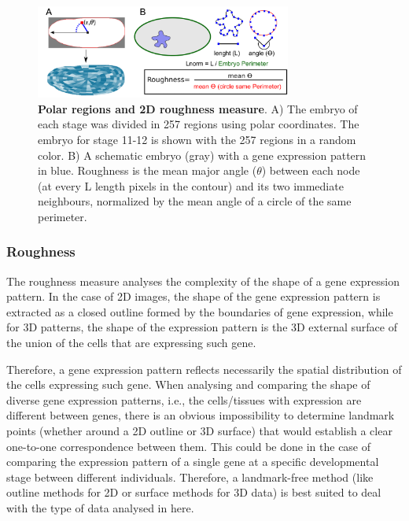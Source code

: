 
\begin{figure}[h]
  \includegraphics[width=0.75\textwidth]{./Images/roughness_regions.png}
  \centering
  \caption{\textbf{Polar regions and 2D roughness measure}. A) The embryo of each stage was divided in 257 regions using polar coordinates. The embryo for stage 11-12 is shown with the 257 regions in a random color. B) A schematic embryo (gray) with a gene expression pattern in blue. Roughness is the mean major angle ($\theta$) between each node (at every L length pixels in the contour) and its two immediate neighbours, normalized by the mean angle of a circle of the same perimeter.
   }
  \label{fig:roughness_regions}
\end{figure}

\subsubsection{Roughness}

The roughness measure analyses the complexity of the shape of a gene expression pattern. In the case of 2D images, the shape of the gene expression pattern is extracted as a closed outline formed by the boundaries of gene expression, while for 3D patterns, the shape of the expression pattern is the 3D external surface of the union of the cells that are expressing such gene.

Therefore, a gene expression pattern reflects necessarily the spatial distribution of the cells expressing such gene. When analysing and comparing the shape of diverse gene expression patterns, i.e., the cells/tissues with expression are different between genes, there is an obvious impossibility to determine landmark points (whether around a 2D outline or 3D surface) that would establish a clear one-to-one correspondence between them. This could be done in the case of comparing the expression pattern of a single gene at a specific developmental stage between different individuals.
Therefore, a landmark-free method (like outline methods for 2D or surface methods for 3D data) is best suited to deal with the type of data analysed in here.

